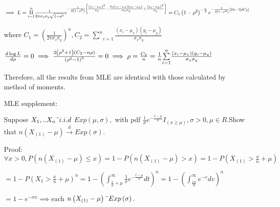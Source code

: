 \documentclass{article}
\begin{document}
$\implies L=\underset{i=1}{\overset{n}{\Pi }}\frac{1}{2\pi \sigma _{x}\sigma
_{y}\sqrt{1-\rho ^{2}}}e^{-\frac{1}{2\left( 1-\rho ^{2}\right) }\left[ \frac{%
\left( x_{i}-\mu _{x}\right) ^{2}}{\sigma _{x}}-\frac{2\rho \left( x_{i}-\mu
_{x}\right) \left( y_{i}-\mu _{y}\right) }{\sigma _{x}\sigma _{y}}+\frac{%
\left( y_{i}-\mu _{y}\right) ^{2}}{\sigma _{y}}\right] }=C_{1}\left( 1-\rho
^{2}\right) ^{-\frac{n}{2}}e^{-\frac{1}{2\left( 1-\rho ^{2}\right) }\left[
2n-2\rho C_{2}\right] }$

where $C_{1}=\left( \frac{1}{2\pi \sigma _{x}\sigma _{y}}\right) ^{n},C_{2}=%
\underset{i=1}{\overset{n}{\sum }}\frac{\left( x_{i}-\mu _{x}\right) \left(
y_{i}-\mu _{y}\right) }{\sigma _{x}\sigma _{y}}$

$\frac{d\log L}{d\rho }=0\implies \frac{2\left( \rho ^{2}+1\right) \left(
C_{2}-n\rho \right) }{\left( \rho ^{2}-1\right) ^{2}}=0\implies \rho =\frac{%
C_{2}}{n}=\frac{1}{n}\underset{i=1}{\overset{n}{\sum }}\frac{\left(
x_{i}-\mu _{x}\right) \left( y_{i}-\mu _{y}\right) }{\sigma _{x}\sigma _{y}}$

Therefore, all the results from MLE are identical with those calculated by
method of moments.

\bigskip 

MLE supplement:

Suppose $X_{1},..X_{n}\symbol{126}i.i.d$ $Exp\left( \mu ,\sigma \right) ,$%
with pdf $\frac{1}{\sigma }e^{-\frac{x-\mu }{\sigma }}I_{\left( x\geq \mu
\right) },\sigma >0,\mu \in R.$Show that $n\left( X_{\left( 1\right) }-\mu
\right) \overset{d}{\rightarrow }Exp\left( \sigma \right) .$

Proof: $\forall x>0,P\left( n\left( X_{\left( 1\right) }-\mu \right) \leq
x\right) =1-P\left( n\left( X_{\left( 1\right) }-\mu \right) >x\right)
=1-P\left( X_{\left( 1\right) }>\frac{x}{n}+\mu \right) $

$=1-P\left( X_{1}>\frac{x}{n}+\mu \right) ^{n}=1-\left( \int_{\frac{x}{n}%
+\mu }^{\infty }\frac{1}{\sigma }e^{-\frac{t-\mu }{\sigma }}dt\right)
^{n}=1-\left( \int_{\frac{x\sigma }{n}}^{\infty }e^{-v}dv\right) ^{n}$

$=1-e^{-\sigma x}\implies $each $n\left( X_{\left( 1\right) }-\mu \right) 
\symbol{126}Exp\left( \sigma \right) .$
\end{document}
